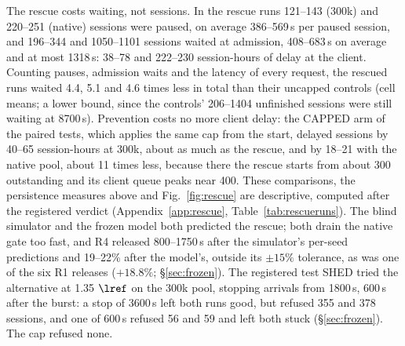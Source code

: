 The rescue costs waiting, not sessions. In the rescue runs 121--143 (300k) and 220--251 (native) sessions were paused, on average 386--569\,s per paused session, and 196--344 and 1050--1101 sessions waited at admission, 408--683\,s on average and at most 1318\,s: 38--78 and 222--230 session-hours of delay at the client. Counting pauses, admission waits and the latency of every request, the rescued runs waited 4.4, 5.1 and 4.6 times less in total than their uncapped controls (cell means; a lower bound, since the controls' 206--1404 unfinished sessions were still waiting at 8700\,s). Prevention costs no more client delay: the CAPPED arm of the paired tests, which applies the same cap from the start, delayed sessions by 40--65 session-hours at 300k, about as much as the rescue, and by 18--21 with the native pool, about 11 times less, because there the rescue starts from about 300 outstanding and its client queue peaks near 400. These comparisons, the persistence measures above and Fig.~\ref{fig:rescue} are descriptive, computed after the registered verdict (Appendix~\ref{app:rescue}, Table~\ref{tab:rescueruns}). The blind simulator and the frozen model both predicted the rescue; both drain the native gate too fast, and R4 released 800--1750\,s after the simulator's per-seed predictions and 19--22\% after the model's, outside its $\pm15\%$ tolerance, as was one of the six R1 releases ($+18.8\%$; \S\ref{sec:frozen}). The registered test SHED tried the alternative at 1.35 $\lref$ on the 300k pool, stopping arrivals from 1800\,s, 600\,s after the burst: a stop of 3600\,s left both runs good, but refused 355 and 378 sessions, and one of 600\,s refused 56 and 59 and left both stuck (\S\ref{sec:frozen}). The cap refused none.

